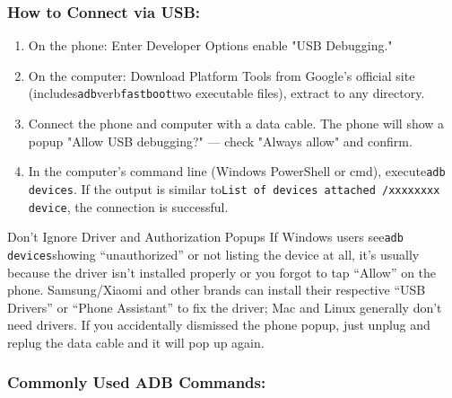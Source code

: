 \subsubsection*{How to Connect via USB:}

\begin{enumerate}
  \item On the phone: Enter Developer Options enable "USB Debugging."
  \item On the computer: Download Platform Tools from Google's official site (includes\texttt{adb}verb\texttt{fastboot}two executable files), extract to any directory.
  \item Connect the phone and computer with a data cable. The phone will show a popup "Allow USB debugging?" — check "Always allow" and confirm.
  \item In the computer's command line (Windows PowerShell or cmd), execute\texttt{adb devices}. If the output is similar to\texttt{List of devices attached /\allowbreak  xxxxxxxx device}, the connection is successful.
\end{enumerate}

\begin{tcbwarn}{Don't Ignore Driver and Authorization Popups}
If Windows users see\texttt{adb devices}showing “unauthorized” or not listing the device at all, it's usually because the driver isn't installed properly or you forgot to tap “Allow” on the phone. Samsung/Xiaomi and other brands can install their respective “USB Drivers” or “Phone Assistant” to fix the driver; Mac and Linux generally don't need drivers. If you accidentally dismissed the phone popup, just unplug and replug the data cable and it will pop up again.

\end{tcbwarn}

\subsubsection*{Commonly Used ADB Commands:}

